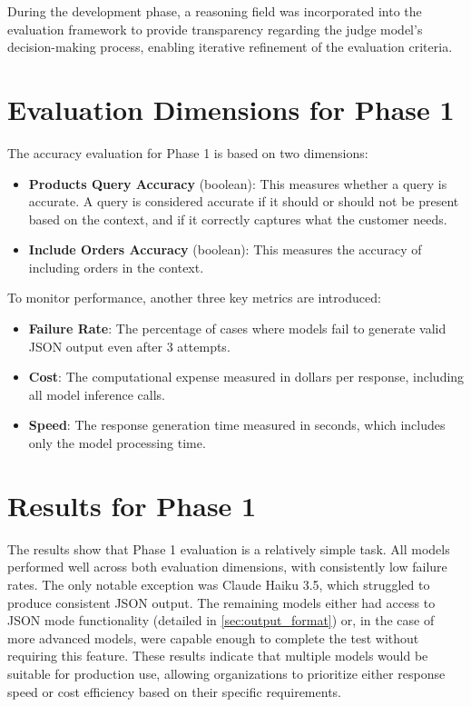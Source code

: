 During the development phase, a reasoning field was incorporated into the evaluation framework to provide transparency regarding the judge model's decision-making process, enabling iterative refinement of the evaluation criteria.


\section{Evaluation Dimensions for Phase 1}

The accuracy evaluation for Phase 1 is based on two dimensions:
\begin{itemize}
    \item \textbf{Products Query Accuracy} (boolean): This measures whether a query is accurate. A query is considered accurate if it should or should not be present based on the context, and if it correctly captures what the customer needs.
    \item \textbf{Include Orders Accuracy} (boolean): This measures the accuracy of including orders in the context.
\end{itemize}
To monitor performance, another three key metrics are introduced:
\begin{itemize}
    \item \textbf{Failure Rate}: The percentage of cases where models fail to generate valid JSON output even after 3 attempts.
    \item \textbf{Cost}: The computational expense measured in dollars per response, including all model inference calls.
    \item \textbf{Speed}: The response generation time measured in seconds, which includes only the model processing time.
\end{itemize}

\section{Results for Phase 1}

The results show that Phase 1 evaluation is a relatively simple task.
All models performed well across both evaluation dimensions, with consistently low failure rates.
The only notable exception was Claude Haiku 3.5, which struggled to produce consistent JSON output.
The remaining models either had access to JSON mode functionality (detailed in \cref{sec:output_format}) or, in the case of more advanced models, were capable enough to complete the test without requiring this feature.
These results indicate that multiple models would be suitable for production use, allowing organizations to prioritize either response speed or cost efficiency based on their specific requirements.

